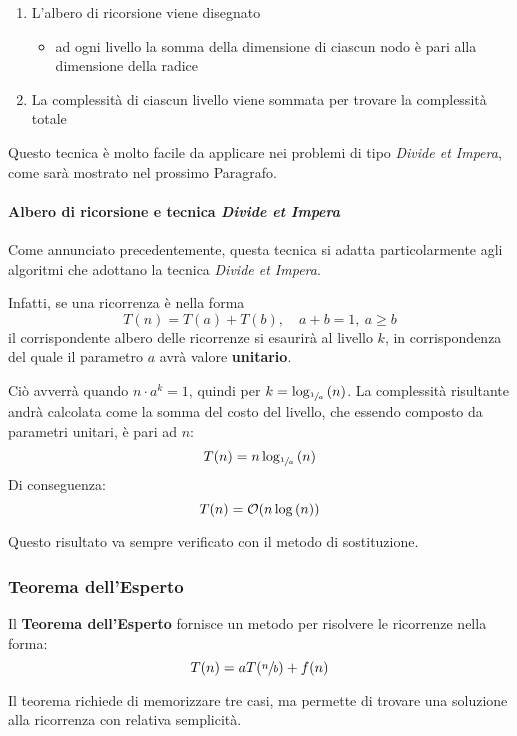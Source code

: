 \documentclass[italian, 10pt]{article}
\begin{document}
\begin{enumerate}
  \item L'albero di ricorsione viene disegnato
        \begin{itemize}[label=\(\rightarrow\)]
          \item ad ogni livello la somma della dimensione di ciascun nodo è pari alla dimensione della radice
        \end{itemize}
  \item La complessità di ciascun livello viene sommata per trovare la complessità totale
\end{enumerate}

\bigskip
Questo tecnica è molto facile da applicare nei problemi di tipo \textit{Divide et Impera}, come sarà mostrato nel prossimo Paragrafo.

\paragraph{Albero di ricorsione e tecnica \textit{Divide et Impera}}

Come annunciato precedentemente, questa tecnica si adatta particolarmente agli algoritmi che adottano la tecnica \textit{Divide et Impera}.

Infatti, se una ricorrenza è nella forma
\[ T(n) = T(a) + T(b),\quad a + b = 1,\ a \geq b \]
il corrispondente albero delle ricorrenze si esaurirà al livello \(k\), in corrispondenza del quale il parametro \(a\) avrà valore \textbf{unitario}.

Ciò avverrà quando \(n \cdot a^k = 1\), quindi per \(k = \log_{\sfrac{1}{a}}{(n)}\).
La complessità risultante andrà calcolata come la somma del costo del livello, che essendo composto da parametri unitari, è pari ad \(n\):
\[ T(n) = n \log_{\sfrac{1}{a}}{(n)} \]
Di conseguenza:
\[ T(n) = \mathcal{O}(n \log{(n)})  \]

Questo risultato va sempre verificato con il metodo di sostituzione.

\subsubsection{Teorema dell'Esperto}
\label{sec:teorema-dell-esperto}

Il \textbf{Teorema dell'Esperto} fornisce un metodo  per risolvere le ricorrenze nella forma:
\[ T(n) = aT(\sfrac{n}{b}) + f(n)\]

Il teorema richiede di memorizzare tre casi, ma permette di trovare una soluzione alla ricorrenza con relativa semplicità.
\end{document}
